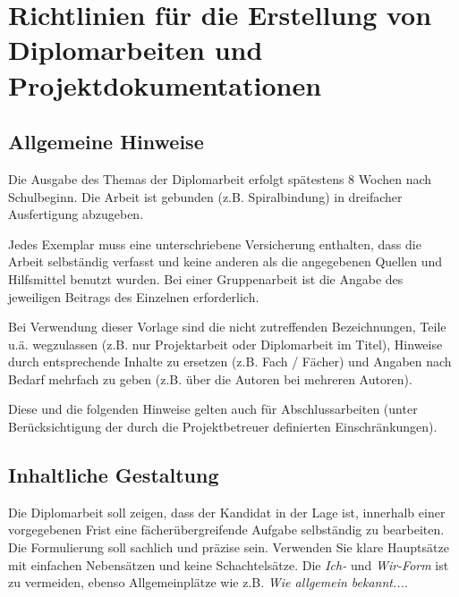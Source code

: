 

\chapter{Richtlinien für die Erstellung von Diplomarbeiten und Projektdokumentationen}


\section{Allgemeine Hinweise}

Die Ausgabe des Themas der Diplomarbeit erfolgt spätestens 8 Wochen nach Schulbeginn. Die Arbeit ist gebunden (z.B. Spiralbindung) in dreifacher Ausfertigung abzugeben. 

Jedes Exemplar muss eine unterschriebene Versicherung enthalten, dass die Arbeit selb\-ständig verfasst und keine anderen als die angegebenen Quellen und Hilfsmittel benutzt wurden. Bei einer Gruppenarbeit ist die Angabe des jeweiligen Beitrags des Einzelnen erforderlich.

Bei Verwendung dieser Vorlage sind die nicht zutreffenden Bezeichnungen, Teile u.ä. wegzulassen (z.B. nur Projektarbeit oder Diplomarbeit im Titel), Hinweise durch entsprechende Inhalte zu ersetzen (z.B. Fach / Fächer) und Angaben nach Bedarf mehrfach zu geben (z.B. über die Autoren bei mehreren Autoren).

Diese und die folgenden Hinweise gelten auch für Abschlussarbeiten (unter Berücksichtigung der durch die Projektbetreuer definierten Einschränkungen).

\section{Inhaltliche Gestaltung}

Die Diplomarbeit soll zeigen, dass der Kandidat in der Lage ist, innerhalb einer vorgegebenen Frist eine fächerübergreifende Aufgabe selb\-ständig zu bearbeiten. Die Formulierung soll sachlich und präzise sein. Verwenden Sie klare Hauptsätze mit einfachen Nebensätzen und keine Schachtelsätze. Die \emph{Ich-} und \emph{Wir-Form} ist zu vermeiden, ebenso Allgemeinplätze wie z.B. \emph{\glqq Wie allgemein bekannt...\grqq}. 

